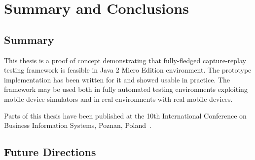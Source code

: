 \chapter{Summary and Conclusions}

\section{Summary}


This thesis is a proof of concept demonstrating that fully-fledged capture-replay
testing framework is feasible in Java 2 Micro Edition environment. The
prototype implementation has been written for it and showed usable in practice. 
The framework may be used both in fully automated testing environments
exploiting mobile device simulators and in real environments with real
mobile devices.

Parts of this thesis have been published at the 10th International Conference on 
Business Information Systems, Poznan, Poland~\cite{zduniak-weiss-2007}.


\section{Future Directions}


